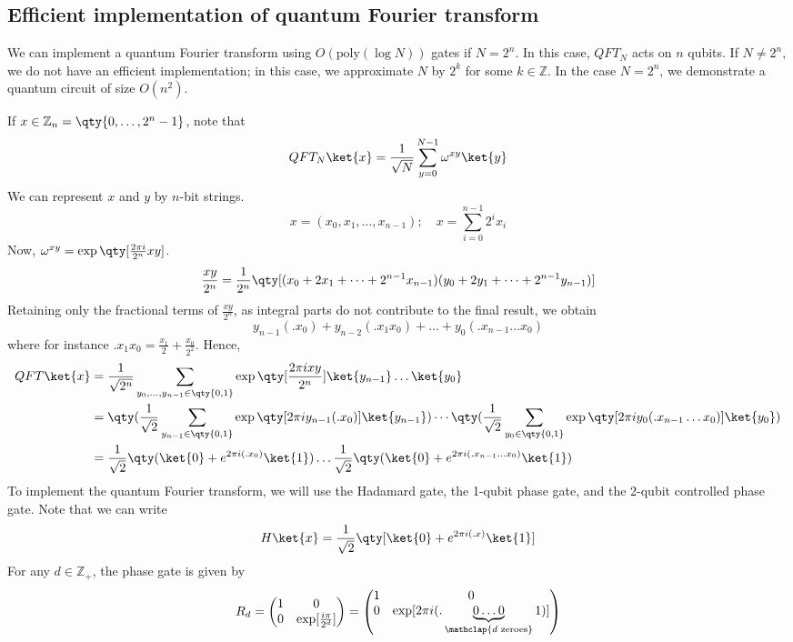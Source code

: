 \subsection{Efficient implementation of quantum Fourier transform}
We can implement a quantum Fourier transform using $O(\mathrm{poly}(\log N))$ gates if $N = 2^n$.
In this case, $QFT_N$ acts on $n$ qubits.
If $N \neq 2^n$, we do not have an efficient implementation; in this case, we approximate $N$ by $2^k$ for some $k \in \mathbb Z$.
In the case $N = 2^n$, we demonstrate a quantum circuit of size $O(n^2)$.

If $x \in \mathbb Z_n = \qty{0, \dots, 2^n - 1}$, note that
\[ QFT_N \ket{x} = \frac{1}{\sqrt{N}} \sum_{y=0}^{N-1} \omega^{xy} \ket{y} \]
We can represent $x$ and $y$ by $n$-bit strings.
\[ x = (x_0, x_1, \dots, x_{n-1});\quad x = \sum_{i=0}^{n-1} 2^i x_i \]
Now, $\omega^{xy} = \exp\qty[\frac{2\pi i}{2^n} xy]$.
\[ \frac{xy}{2^n} = \frac{1}{2^n} \qty[(x_0 + 2x_1 + \dots + 2^{n-1} x_{n-1})(y_0 + 2y_1 + \dots + 2^{n-1} y_{n-1})] \]
Retaining only the fractional terms of $\frac{xy}{2^n}$, as integral parts do not contribute to the final result, we obtain
\[ y_{n-1}(.x_0) + y_{n-2}(.x_1 x_0) + \dots + y_0(.x_{n-1} \dots x_0) \]
where for instance $.x_1 x_0 = \frac{x_1}{2} + \frac{x_0}{2^2}$.
Hence,
\begin{align*}
    QFT \ket{x} &= \frac{1}{\sqrt{2^n}} \sum_{y_0, \dots, y_{n-1} \in \qty{0,1}} \exp\qty[\frac{2\pi i xy}{2^n}] \ket{y_{n-1}} \dots \ket{y_0} \\
    &= \qty(\frac{1}{\sqrt{2}} \sum_{y_{n-1} \in \qty{0,1}} \exp\qty[2 \pi i y_{n-1} (.x_0)] \ket{y_{n-1}}) \cdots \qty(\frac{1}{\sqrt{2}} \sum_{y_0 \in \qty{0,1}} \exp\qty[2 \pi i y_0 (.x_{n-1}\dots x_0)] \ket{y_0}) \\
    &= \frac{1}{\sqrt{2}} \qty(\ket{0} + e^{2\pi i (.x_0)} \ket{1}) \dots \frac{1}{\sqrt{2}} \qty(\ket{0} + e^{2\pi i (.x_{n-1} \dots x_0)} \ket{1})
\end{align*}
To implement the quantum Fourier transform, we will use the Hadamard gate, the 1-qubit phase gate, and the 2-qubit controlled phase gate.
Note that we can write
\[ H\ket{x} = \frac{1}{\sqrt{2}} \qty[\ket{0} + e^{2\pi i(.x)} \ket{1}] \]
For any $d \in \mathbb Z_+$, the phase gate is given by
\[ R_d = \begin{pmatrix}
    1 & 0 \\
    0 & \exp[\frac{i\pi}{2^d}]
\end{pmatrix} = \begin{pmatrix}
    1 & 0 \\
    0 & \exp[2\pi i(.\underbrace{0\dots 0}_{\mathclap{d \text{ zeroes}}}1)]
\end{pmatrix} \]
